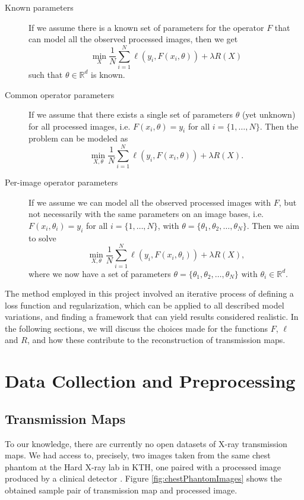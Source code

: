 \documentclass[nomenclature, english, bibtex]{kththesis}
\numberwithin{listing}{chapter}
\begin{document}
\begin{description}
    \item[Known parameters] If we assume there is a known set of parameters for the operator $F$ that can model all the observed processed images, then we get
    \begin{equation}
        \min_{X} \frac{1}{N}\sum_{i=1}^{N} \ell(y_i, F(x_i, \theta)) + \lambda R(X)
    \end{equation}
    such that $\theta \in \mathbb{R}^d$ is known.
    \item[Common operator parameters] If we assume that there exists a single set of parameters $\theta$ (yet unknown) for all processed
    images, i.e. $F(x_i, \theta) = y_i$ for all $i = \{1,\dots,N\}$. Then the problem can be modeled as
    \begin{equation}
        \min_{X, \theta} \frac{1}{N}\sum_{i=1}^{N} \ell(y_i, F(x_i, \theta)) + \lambda R(X).
    \end{equation}
    \item[Per-image operator parameters] If we assume we can model all the observed processed images with $F$, but not necessarily with the same parameters on an image bases,
    i.e. $F(x_i, \theta_i) = y_i$ for all $i = \{1,\dots,N\}$, with  $\theta = \{ \theta_1, \theta_2, \dots, \theta_N \}$. Then we aim to solve
    \begin{equation}
        \min_{X, \theta} \frac{1}{N}\sum_{i=1}^{N} \ell(y_i, F(x_i, \theta_i)) + \lambda R(X),
    \end{equation}
    where we now have a set of parameters $\theta = \{\theta_1, \theta_2, \dots, \theta_N\} \text{ with }\theta_i \in \mathbb{R}^{d}$.
\end{description}


The method employed in this project involved an iterative process of defining a loss function and regularization,
which can be applied to all described model variations, and finding a framework that can yield results considered realistic.
In the following sections, we will discuss the choices made for the functions $F$, $\ell$ and $R$, and how these contribute
to the reconstruction of transmission maps.

\section{Data Collection and Preprocessing}
\label{sec:dataCollection}


\subsection{Transmission Maps}
To our knowledge, there are currently no open datasets of X-ray transmission maps.
We had access to, precisely, two images taken from the same chest phantom at the Hard X-ray lab in KTH, one paired with a processed
image produced by a clinical detector . Figure \ref{fig:chestPhantomImages} shows the obtained sample pair of transmission map and
processed image.
\end{document}
